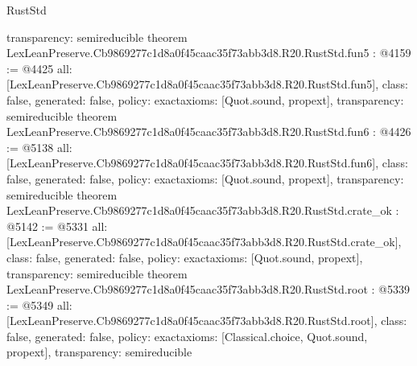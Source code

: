 \begin{lexlean}{RustStd}
\begin{coremodule}
{  transparency: semireducible
}
theorem LexLeanPreserve.Cb9869277c1d8a0f45caac35f73abb3d8.R20.RustStd.fun5 : @4159 := @4425 {
  all: [LexLeanPreserve.Cb9869277c1d8a0f45caac35f73abb3d8.R20.RustStd.fun5],
  class: false,
  generated: false,
  policy: exact{axioms: [Quot.sound, propext]},
  transparency: semireducible
}
theorem LexLeanPreserve.Cb9869277c1d8a0f45caac35f73abb3d8.R20.RustStd.fun6 : @4426 := @5138 {
  all: [LexLeanPreserve.Cb9869277c1d8a0f45caac35f73abb3d8.R20.RustStd.fun6],
  class: false,
  generated: false,
  policy: exact{axioms: [Quot.sound, propext]},
  transparency: semireducible
}
theorem LexLeanPreserve.Cb9869277c1d8a0f45caac35f73abb3d8.R20.RustStd.crate_ok : @5142 := @5331 {
  all: [LexLeanPreserve.Cb9869277c1d8a0f45caac35f73abb3d8.R20.RustStd.crate_ok],
  class: false,
  generated: false,
  policy: exact{axioms: [Quot.sound, propext]},
  transparency: semireducible
}
theorem LexLeanPreserve.Cb9869277c1d8a0f45caac35f73abb3d8.R20.RustStd.root : @5339 := @5349 {
  all: [LexLeanPreserve.Cb9869277c1d8a0f45caac35f73abb3d8.R20.RustStd.root],
  class: false,
  generated: false,
  policy: exact{axioms: [Classical.choice, Quot.sound, propext]},
  transparency: semireducible
}


\end{coremodule}
\end{lexlean}
